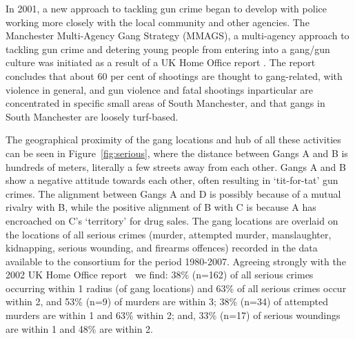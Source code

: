 \documentclass[twocolumn]{svjour3}          %
\theoremstyle{definition}
\begin{document}
In 2001, a new approach to tackling gun crime began to develop with
police working more closely with the local community and other
agencies. The Manchester Multi-Agency Gang Strategy (MMAGS), a
multi-agency approach to tackling gun crime and detering young people
from entering into a gang/gun culture was initiated as a result of a
UK Home Office report \citep{BullockTilley2002}. The report concludes
that about 60 per cent of shootings are thought to gang-related, with
violence in general, and gun violence and fatal shootings inparticular
are concentrated in specific small areas of South Manchester, and that
gangs in South Manchester are loosely turf-based.

The geographical proximity of the gang locations and hub of all these
activities can be seen in Figure~\ref{fig:serious}, where the distance
between Gangs A and B is hundreds of meters, literally a few streets
away from each other.  Gangs A and B show a negative attitude towards
each other, often resulting in `tit-for-tat' gun crimes. The alignment
between Gangs A and D is possibly because of a mutual rivalry with B,
while the positive alignment of B with C is because A has encroached
on C's `territory' for drug sales. The gang locations are overlaid on
the locations of all serious crimes (murder, attempted murder,
manslaughter, kidnapping, serious wounding, and firearms offences)
recorded in the data available to the consortium for the period
1980-2007. Agreeing strongly with the 2002 UK Home Office
report~\citep{BullockTilley2002} we find: 38\% (n=162) of all serious
crimes occurring within \unit{1}{\kilo\meter} radius (of gang
locations) and 63\% of all serious crimes occur within
\unit{2}{\kilo\meter}, and 53\% (n=9) of murders are within
\unit{3}{\kilo\meter}; 38\% (n=34) of attempted murders are within
\unit{1}{\kilo\meter} and 63\% within \unit{2}{\kilo\meter}; and, 33\%
(n=17) of serious woundings are within \unit{1}{\kilo\meter} and 48\%
are within \unit{2}{\kilo\meter}.
\end{document}
